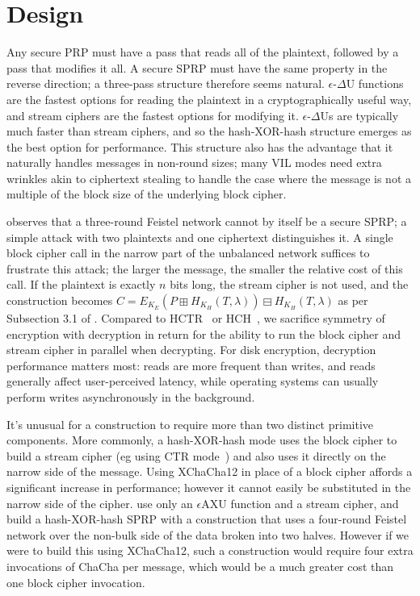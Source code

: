 \documentclass[eprint.tex]{subfiles}
\begin{document}
\section{Design}
Any secure PRP must have a pass that reads all of the plaintext, followed by a pass that modifies
it all. A secure SPRP must have the same property in the reverse direction;
a three-pass structure therefore seems natural.
$\epsilon$-$\Delta$U functions are the fastest options for reading the plaintext in a
cryptographically useful way, and stream ciphers are the fastest options for modifying it.
$\epsilon$-$\Delta$Us
are typically much faster than stream ciphers, and so the hash-XOR-hash structure emerges as
the best option for performance. This structure also has the advantage that it naturally handles
messages in non-round sizes; many VIL modes need extra wrinkles akin to ciphertext stealing
to handle the case where the message is not
a multiple of the block size of the underlying block cipher.

\cite{luby-rackoff} observes that a three-round Feistel network cannot by itself be a secure SPRP;
a simple attack with two plaintexts and one ciphertext distinguishes it. A single block cipher call
in the narrow part of the unbalanced network suffices to frustrate this attack; the
larger the message, the smaller the relative cost of this call. If the plaintext is exactly $n$ bits
long, the stream cipher is not used, and the construction becomes
$C = E_{K_E}(P \boxplus H_{K_H}(T, \lambda)) \boxminus H_{K_H}(T, \lambda)$
as per Subsection 3.1 of \cite{tweakable}.
Compared to HCTR~\cite{hctr} or HCH~\cite{hch}, we sacrifice
symmetry of encryption with decryption in return for
the ability to run the block cipher and stream cipher in parallel when decrypting.
For disk encryption, decryption performance matters most:
reads are more frequent than writes, and reads generally affect user-perceived latency, while
operating systems can usually perform writes asynchronously in the background.

It's unusual for a construction to require more than two distinct primitive components.
More commonly, a hash-XOR-hash mode uses the block cipher to build a stream cipher
(eg using CTR mode~\cite{ctr}) and also uses it directly on the narrow side of the message.
Using XChaCha12 in place of a block cipher affords a significant increase in performance;
however it cannot easily be substituted in the narrow side of the cipher.
\cite{sarkar1,sarkar2,sarkar3,sarkar4} use only an $\epsilon$AXU function
and a stream cipher, and build a hash-XOR-hash SPRP
with a construction that uses a four-round Feistel network over the non-bulk side of the data
broken into two halves. However if we were to build this using XChaCha12,
such a construction would require four extra invocations of ChaCha per message, which would be
a much greater cost than one block cipher invocation.
\end{document}

